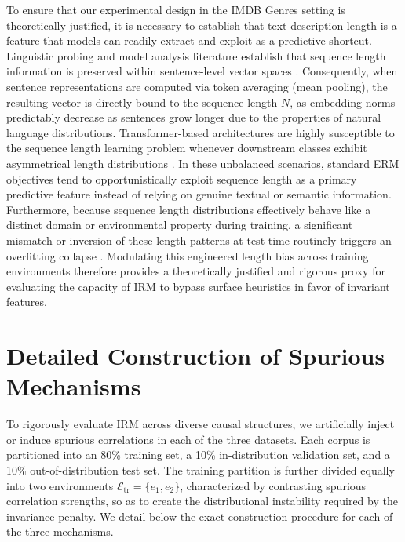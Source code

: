\documentclass[11pt]{article}
\theoremstyle{definition}
\theoremstyle{plain}
\begin{document}
To ensure that our experimental design in the IMDB Genres setting is theoretically justified, it is necessary to establish that text description length is a feature that models can readily extract and exploit as a predictive shortcut. Linguistic probing and model analysis literature establish that sequence length information is preserved within sentence-level vector spaces \citep{adi2016finegrained}. Consequently, when sentence representations are computed via token averaging (mean pooling), the resulting vector is directly bound to the sequence length $N$, as embedding norms predictably decrease as sentences grow longer due to the properties of natural language distributions. Transformer-based architectures are highly susceptible to the sequence length learning problem whenever downstream classes exhibit asymmetrical length distributions \citep{baillargeon2022assessing}. In these unbalanced scenarios, standard ERM objectives tend to opportunistically exploit sequence length as a primary predictive feature instead of relying on genuine textual or semantic information. Furthermore, because sequence length distributions effectively behave like a distinct domain or environmental property during training, a significant mismatch or inversion of these length patterns at test time routinely triggers an overfitting collapse \citep{varis-bojar-2021-sequence}. Modulating this engineered length bias across training environments therefore provides a theoretically justified and rigorous proxy for evaluating the capacity of IRM to bypass surface heuristics in favor of invariant features.

\section{Detailed Construction of Spurious Mechanisms}
\label{app:mechanisms}

To rigorously evaluate IRM across diverse causal structures, we artificially inject or induce spurious correlations in each of the three datasets. Each corpus is partitioned into an 80\% training set, a 10\% in-distribution validation set, and a 10\% out-of-distribution test set. The training partition is further divided equally into two environments $\mathcal{E}_{\text{tr}} = \{e_1, e_2\}$, characterized by contrasting spurious correlation strengths, so as to create the distributional instability required by the invariance penalty. We detail below the exact construction procedure for each of the three mechanisms.
\end{document}
